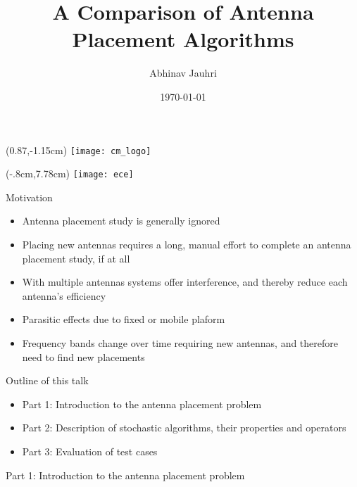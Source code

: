 \documentclass{beamer}
\title{\color{univred} A Comparison of Antenna Placement Algorithms}
\author{Abhinav Jauhri}
\date{\today}
\let\otp\titlepage
\renewcommand{\titlepage}{\otp\addtocounter{framenumber}{-1}}
\begin{document}
\begin{frame}[plain]
    \begin{textblock*}{100mm}(0.87\textwidth,-1.15cm)
        \texttt{[image: cm\_logo]}
    \end{textblock*}
    \begin{textblock*}{10mm}(-.8cm,7.78cm)
        \texttt{[image: ece]}
    \end{textblock*}
    \color{univred}
    \titlepage
\end{frame}

\begin{frame}{Motivation}
\begin{itemize} \itemsep1.5em
        \item Antenna placement study is generally ignored 
        \item Placing new antennas requires a long, manual effort to complete an antenna placement study, if at all
        \item With multiple antennas systems offer interference, and thereby reduce each antenna's efficiency
        \item Parasitic effects due to fixed or mobile plaform 
        \item Frequency bands change over time requiring new antennas, and therefore need to find new placements
    \end{itemize}
    \vspace{5mm}
\end{frame}

\begin{frame}{Outline of this talk}
    \begin{itemize}
        \setlength\itemsep{2em}
        \item Part 1: Introduction to the antenna placement problem
        \item Part 2: Description of stochastic algorithms, their properties and operators
        \item Part 3: Evaluation of test cases
    \end{itemize}
\end{frame}

\begin{frame}{\null}
    \begin{tcolorbox}[colback=green!5]
        \centering\Huge
        Part 1: Introduction to the antenna placement problem
    \end{tcolorbox}
\end{frame}
\end{document}
